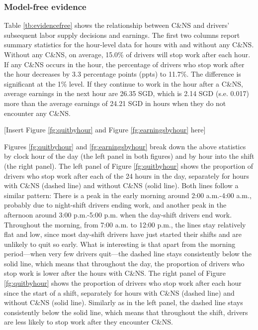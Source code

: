 \documentclass[reviewmode]{restud}
\begin{document}
\subsubsection{Model-free evidence}
Table \ref{tb:evidencefree} shows the relationship between C\&NS and drivers' subsequent labor supply decisions and earnings. The first two columns report summary statistics for the hour-level data for hours with and without any C\&NS. Without any C\&NS, on average, 15.0\% of drivers will stop work after each hour.
If any C\&NS occurs in the hour, the percentage of drivers who stop work after the hour decreases by 3.3 percentage points (ppts) to 11.7\%. The difference is significant at the 1\% level. If they continue to work in the hour after a C\&NS, average earnings in the next hour are 26.35 SGD, which is 2.14 SGD (s.e. 0.017) more than the average earnings of 24.21 SGD in hours when they do not encounter any C\&NS. 
\begin{center}
	[Insert Figure \ref{fg:quitbyhour} and Figure \ref{fg:earningsbyhour} here]
\end{center}


Figures \ref{fg:quitbyhour} and \ref{fg:earningsbyhour} break down the above  statistics by clock hour of the day (the left panel in both figures) and by hour into the shift (the right panel). The left panel of Figure \ref{fg:quitbyhour} shows the proportion of drivers who stop work after each of the 24 hours in the day, separately for hours with C\&NS (dashed line) and without C\&NS (solid line). Both lines follow a similar pattern: There is a peak in the early morning around 2:00 a.m.-4:00 a.m., probably due to night-shift drivers ending work, and another peak in the afternoon around 3:00 p.m.-5:00 p.m. when the day-shift drivers end work. Throughout the morning, from 7:00 a.m. to 12:00 p.m., the lines stay relatively flat and low, since most day-shift drivers have just started their shifts and are unlikely to quit so early. What is interesting is that apart from the morning period---when very few drivers quit---the dashed line stays consistently below the solid line, which means that throughout  the day, the proportion of drivers who stop work is lower after the hours with C\&NS. The right panel of Figure \ref{fg:quitbyhour} shows the proportion of drivers who stop work after each hour since the start of a shift, separately for hours with C\&NS (dashed line) and without C\&NS (solid line). Similarly as in the left panel, the dashed line stays consistently below the solid line, which means that throughout the shift, drivers are less likely to stop work after they encounter C\&NS.
\end{document}
